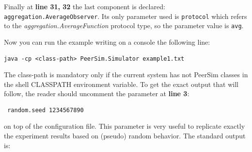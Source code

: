 \documentclass[a4paper,11pt]{article}
\begin{document}
Finally at \textbf{line 31, 32} the last component is declared:
\texttt{aggregation.AverageObserver}.
Its only parameter used is \texttt{protocol} which refers to the
\emph{aggregation.AverageFunction} protocol type, so the parameter
value is \texttt{avg}.

Now you can run the example writing on a console the following line:

\begin{verbatim}
java -cp <class-path> PeerSim.Simulator example1.txt \end{verbatim}

The class-path is mandatory only if the current system has not PeerSim
classes in the shell CLASSPATH environment variable. To get the exact
output that will follow, the reader should uncomment the parameter
at \textbf{line 3}:

\begin{verbatim} random.seed 1234567890 \end{verbatim}

on top of the configuration file. This parameter is very useful to
replicate exactly the experiment results based on (pseudo) random
behavior. The standard output is:
\end{document}
